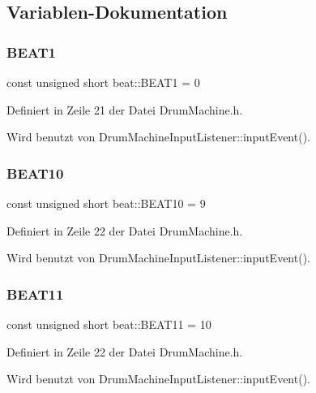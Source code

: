 \subsection{Variablen-\/\+Dokumentation}
\mbox{\label{namespacebeat_ae859561033de8f2140542a8bea7d5f02}} 
\subsubsection{\texorpdfstring{B\+E\+A\+T1}{BEAT1}}
{\footnotesize\ttfamily const unsigned short beat\+::\+B\+E\+A\+T1 = 0}



Definiert in Zeile 21 der Datei Drum\+Machine.\+h.



Wird benutzt von Drum\+Machine\+Input\+Listener\+::input\+Event().

\mbox{\label{namespacebeat_abd0eb0f3160a3579b574ffa8bf94282c}} 
\subsubsection{\texorpdfstring{B\+E\+A\+T10}{BEAT10}}
{\footnotesize\ttfamily const unsigned short beat\+::\+B\+E\+A\+T10 = 9}



Definiert in Zeile 22 der Datei Drum\+Machine.\+h.



Wird benutzt von Drum\+Machine\+Input\+Listener\+::input\+Event().

\mbox{\label{namespacebeat_a4ba76b47d18db4674af1ca28136614e2}} 
\subsubsection{\texorpdfstring{B\+E\+A\+T11}{BEAT11}}
{\footnotesize\ttfamily const unsigned short beat\+::\+B\+E\+A\+T11 = 10}



Definiert in Zeile 22 der Datei Drum\+Machine.\+h.



Wird benutzt von Drum\+Machine\+Input\+Listener\+::input\+Event().

